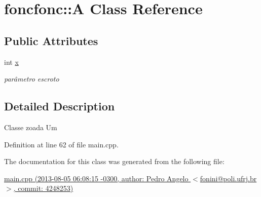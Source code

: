 \hypertarget{classfoncfonc_1_1A}{\section{foncfonc\-:\-:A Class Reference}
\label{classfoncfonc_1_1A}
}
\subsection*{Public Attributes}
\begin{DoxyCompactItemize}
\item 
\hypertarget{classfoncfonc_1_1A_a54959ea2ab58000251776e0d819878f2}{int \hyperlink{classfoncfonc_1_1A_a54959ea2ab58000251776e0d819878f2}{x}}\label{classfoncfonc_1_1A_a54959ea2ab58000251776e0d819878f2}

\begin{DoxyCompactList}\small\item\em parâmetro escroto \end{DoxyCompactList}\end{DoxyCompactItemize}


\subsection{Detailed Description}
Classe zoada Um 

Definition at line 62 of file main.\-cpp.



The documentation for this class was generated from the following file\-:\begin{DoxyCompactItemize}
\item 
\hyperlink{main_8cpp}{main.\-cpp (2013-\/08-\/05 06\-:08\-:15 -\/0300, author\-: Pedro Angelo $<$fonini@poli.\-ufrj.\-br$>$, commit\-: 4248253)}\end{DoxyCompactItemize}
